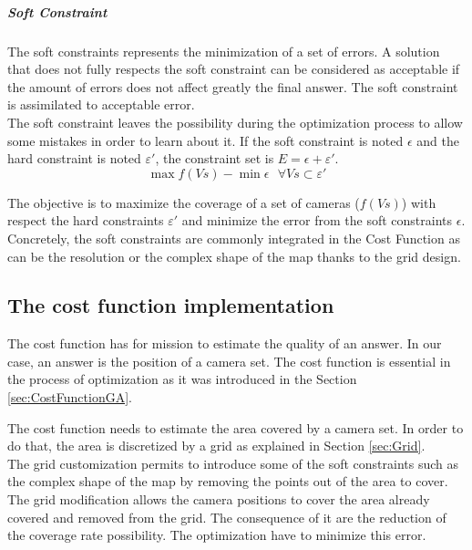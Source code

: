  \subparagraph{Soft Constraint} 
 The soft constraints represents the minimization of a set of errors. 
A solution that does not fully respects the soft constraint can be considered as acceptable if the
 amount of errors does not affect greatly the final answer. The soft constraint is assimilated to acceptable error. \\
 The soft constraint leaves the possibility during the optimization process to allow some mistakes in order to learn about it.  
 If the soft constraint is noted $\epsilon$ and the hard constraint is noted $ \varepsilon '$, the constraint set is $E=\epsilon+\varepsilon'$.\\
 
  \begin{equation}\label{eq:constraintEpsilon}
 	\max f(Vs) - \min \epsilon  \mbox{  } \forall Vs \subset \varepsilon'
 \end{equation}
 
The objective is to maximize the coverage of a set of cameras ($f(Vs)$) with respect the hard constraints $\varepsilon'$ and minimize the error from the soft constraints $\epsilon$.
Concretely, the soft constraints are commonly integrated in the Cost Function as can be the resolution or  the  complex shape of the map thanks to the grid design. 


\subsection{The cost function implementation} \label{sec:costFun}

The cost function has for mission to estimate the quality of an answer. In our case, an answer is the position  of a camera set. The cost function is essential in the process of optimization as it was introduced in the Section \ref{sec:CostFunctionGA}.

The cost function needs to estimate the area covered by a camera set. In order to do that, the area is discretized by a grid as explained in Section \ref{sec:Grid}. \\
The grid customization permits to introduce some of the soft constraints such as the complex shape of the map by removing the points out of the area to cover.  \\
The grid modification  allows the camera positions to cover the area already covered and removed from the grid. The consequence of it are the reduction of the coverage rate possibility. The optimization have to minimize this error.

